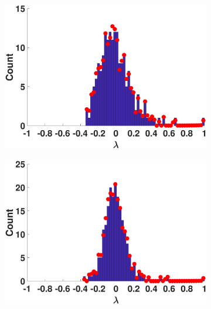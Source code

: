\begin{figure}[htp]
\begin{subfigure}[t]{0.19\textwidth}
    \includegraphics[width=\textwidth,trim = .4cm 0.5cm 3.5cm 1.3cm,clip]
    {./ndos/pics/hp}
    \label{fig:hp_dos}
  \end{subfigure}
  \begin{subfigure}[t]{0.19\textwidth}
    \centering  
    \captionsetup{justification=centering,font=scriptsize}
    \includegraphics[width=\textwidth,trim = .4cm 0.5cm 3.5cm 1.3cm,clip]
    {./ndos/pics/twitter}
    \label{fig:twitter_dos}
  \end{subfigure}
  \begin{subfigure}[t]{0.19\textwidth}
    \centering  
    \captionsetup{justification=centering,font=scriptsize}

\end{subfigure}
\end{figure}
